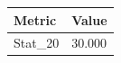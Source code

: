 \begin{tabular}{ll}
\toprule
Metric & Value \\
\midrule
Stat\_20 & 30.000 \\
\bottomrule
\end{tabular}